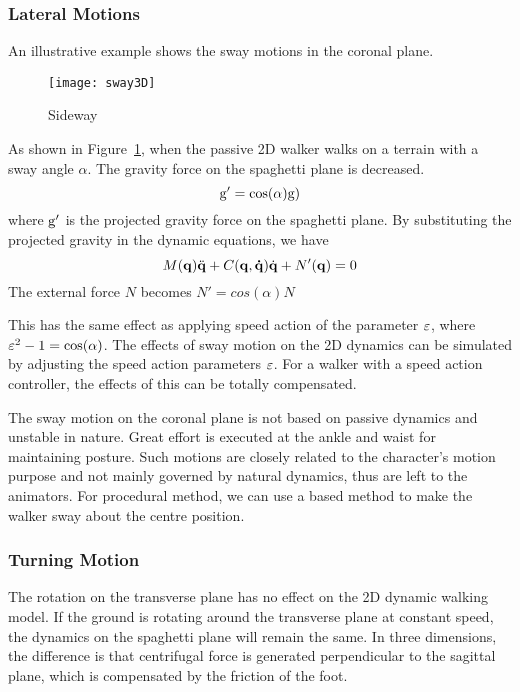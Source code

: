 \subsubsection*{Lateral Motions}
An illustrative example shows the sway motions in the coronal plane.

\begin{figure}[!htbp]
  \begin{center}
      \texttt{[image: sway3D]}
    \caption{Sideway}
    \label{fig:sidesway}
\end{center}
\end{figure}

As shown in Figure~\ref{fig:sidesway}, when the passive 2D walker walks on a terrain with a sway angle $\alpha$.
The gravity force on the spaghetti plane is decreased.
\[
\mathrm{g}'=\cos(\alpha)\mathrm{g})
\]
where $\mathrm{g}'$ is the projected gravity force on the spaghetti plane.
By substituting the projected gravity in the dynamic equations, we have
\begin{equation}
\label{eq:flyequation}
M(\mathbf{q}) \ddot{\mathbf{q}} + C(\mathbf{q,\dot{q}})\dot{\mathbf{q}} + N'(\mathbf{q}) = 0
\end{equation}
The external force $N$ becomes $N'=cos(\alpha)N$

This has the same effect as applying speed action of the parameter $\varepsilon$, where $\varepsilon^2-1=\cos(\alpha)$.
The effects of sway motion on the 2D dynamics can be simulated by adjusting the speed action parameters $\varepsilon$.
For a walker with a speed action controller, the effects of this {\dof} can be totally compensated.

The sway motion on the coronal plane is not  based  on passive dynamics and unstable in nature\citep{kuo1999stabilization}.
Great effort is executed at the ankle and waist for maintaining posture.
Such motions are closely related to the character's motion purpose and not mainly governed by natural dynamics, thus are left to the animators.
For procedural method, we can use a \pd based method to make the walker sway about the centre position.


\subsubsection*{Turning Motion}
The rotation on the transverse plane has no effect on the 2D dynamic walking model.
If the ground is rotating around the transverse plane at constant speed, the dynamics on the spaghetti plane will remain the same.
In three dimensions, the difference is that centrifugal force is generated perpendicular to the sagittal plane, which is  compensated by the friction of the foot.

